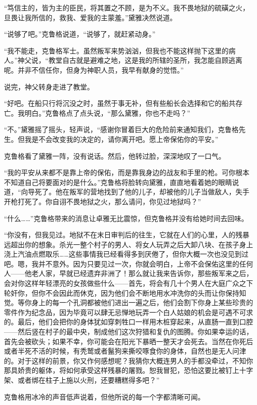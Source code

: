 “笃信主的，皆为主的臣民，将其置之不顾，是为不义。我不畏地狱的硫磺之火，旦畏让我所信的，救我、爱我的主蒙羞。”黛雅决然说道。

“说够了吧。”克鲁格说道，“说够了，就赶紧动身。”

“我不能走，克鲁格军士。虽然叛军来势汹汹，但我也不能这样抛下这里的病人。”神父说，“教堂自古就是避难之地，这是我的所辖的圣所，我怎能自顾逃离呢。并非不信任你，但身为神职人员，我早有献身的觉悟。”

说完，神父转身走进了教堂。

“好吧。在船只行将沉没之时，虽然于事无补，但有些船长会选择和它的船共存亡。我明白。”克鲁格点了点头说，“那么黛雅，你也不走吗？”

“不。”黛雅摇了摇头，轻声说，“感谢你冒着巨大的危险前来通知我们，克鲁格先生。但我是不会改变我的决定的，请你离开吧。愿上帝保佑你的平安。”

克鲁格看了黛雅一阵，没有说话。然后，他转过脸，深深地叹了一口气。

“我的平安从来都不是靠上帝的保佑，而是靠我身边的战友和手里的枪。可你根本不知道自己将要面对的是什么。”克鲁格将脸转向黛雅，直直地看着她的眼睛说道，“向导死了。他在叛军的营地找到了他的儿子，却被他的儿子当做敌人，失手开枪打死了。你自诩不畏地狱之火，那么请问，你见过地狱吗？”

“什么……”克鲁格带来的消息让卓雅无比震惊，但克鲁格并没有给她时间去回味。

“你没有，但我见过。地狱不在末日审判后的往生，它就在人们的心里，人的残暴远超出你的想象。杀光一整个村子的男人、将女人玩弄之后大卸八块、在孩子身上浇上汽油点燃取乐……这些事情我已经看得多到厌倦了，但你大概一次也没见到过吧。嗯，我并不意外。因为只要见过一次，你就会明白，上帝不会保佑这里的任何人——他老人家，早就已经遗弃非洲了！那么就让我来告诉你，那些叛军来之后，会对你这样年轻漂亮的女孩做些什么——首先，将会有几十个男人在大庭广众之下轮奸你，但你不会因此而休克，因为他们会不断地用水冲洗你的头而让你保持知觉。等你身上的每一个孔洞都被他们进出一遍之后，他们会割下你身上某些珍贵的零件作为纪念品，因为毕竟可以肆无忌惮地玩弄一个白人姑娘的机会是可遇不可求的。最后，他们会把你的身体犹如穿刺牲口一样用木桩穿起来，从直肠一直到口腔——然后竖在村子的最中央，制成他们这次狩猎和复仇的图腾。你如果幸运的话，首先会被砍头；如果不幸，你可能会在阳光下暴晒一整天才会死去。当然在你死后或者半死不活的时候，有秃鹫或者鬣狗来撕咬啄食你的身体，自然也是无人问津的。对于这样的前景，你又作何感想呢？我猜你大概连男人的手都没牵过，不知你那具娇贵的躯体，将如何承受这样残暴的屠戮。恕我冒犯，恐怕这要比被钉上十字架、或者绑在柱子上施以火刑，还要糟糕得多吧？”

克鲁格用冰冷的声音低声说着，但他所说的每一个字都清晰可闻。

